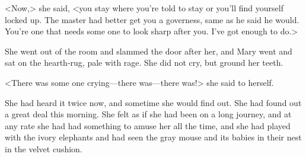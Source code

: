 <Now,> she said, <you stay where you're told to stay or you'll find yourself locked up. The master had better get you a governess, same as he said he would. You're one that needs some one to look sharp after you. I've got enough to do.>

She went out of the room and slammed the door after her, and Mary went and sat on the hearth-rug, pale with rage. She did not cry, but ground her teeth.

<There was some one crying—there was—there was!> she said to herself.

She had heard it twice now, and sometime she would find out. She had found out a great deal this morning. She felt as if she had been on a long journey, and at any rate she had had something to amuse her all the time, and she had played with the ivory elephants and had seen the gray mouse and its babies in their nest in the velvet cushion.